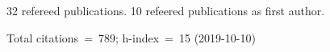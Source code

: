 32 refereed publications. 10 refeered publications as first author.

Total citations~=~789; h-index~=~15 (2019-10-10)